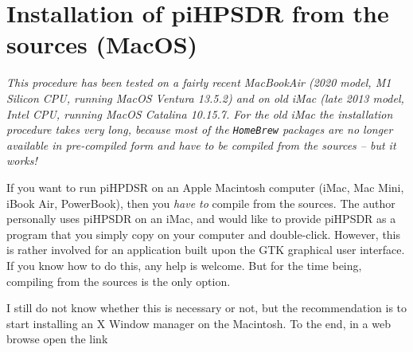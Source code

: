\documentclass[12pt]{book}
\begin{document}
\chapter[MacOS: piHPDSR install from sources]{Installation of piHPSDR from the sources (MacOS)}
\label{sec:installmacosx}

\textit{This procedure has been tested on a  fairly recent MacBookAir (2020 model, M1 Silicon CPU, running 
MacOS
Ventura 13.5.2) and on old iMac (late 2013 model, Intel CPU, running MacOS Catalina 10.15.7.
For the old iMac the installation procedure takes very long, because most of the \texttt{HomeBrew} packages
are no longer available in pre-compiled form and have to be compiled from the sources -- but it works!}

If you want to run piHPDSR on an Apple Macintosh computer (iMac, Mac Mini, iBook Air, PowerBook), then
you \textit{have to} compile from the sources. The author personally uses piHPSDR on an iMac, and would like
to provide piHPSDR as a program that you simply copy on your computer and double-click. However, this is
rather involved for an application built upon the GTK graphical user interface. If you know how to do this,
any help is welcome. But for the time being, compiling from the sources is the only option.

\begin{center}
\end{center}

I still do not know whether this is necessary or not, but the recommendation is to start installing
an X Window manager on the Macintosh. To the end, in a web browse open the link
\end{document}
